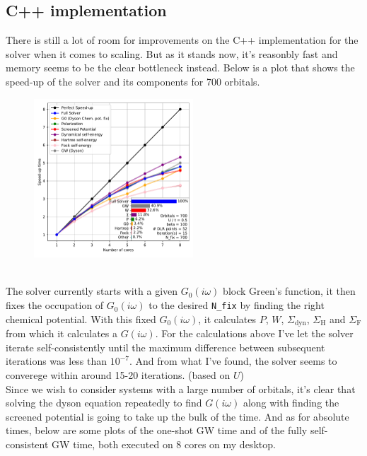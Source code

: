 \documentclass[12pt]{article}
\begin{document}
\noindent
\subsection*{C++ implementation}
There is still a lot of room for improvements on the C++ implementation for the solver when it comes to scaling. But as it stands now, it's reasonbly fast and memory seems to be the clear bottleneck instead. Below is a plot that shows the speed-up of the solver and its components for 700 orbitals.
\begin{figure}[h!]
  \centering

    \includegraphics[width=0.53\textwidth]{700.pdf}
\end{figure}\\
The solver currently starts with a given $G_0(i\omega)$ block Green's function, it then fixes the occupation of $G_0(i\omega)$ to the desired \texttt{N\_fix} by finding the right chemical potential. With this fixed $G_0(i\omega)$, it calculates $P$, $W$, $\Sigma_\text{dyn}$, $\Sigma_\text{H}$ and $\Sigma_\text{F}$ from which it calculates a $G(i\omega)$. For the calculations above I've let the solver iterate self-consistently until the maximum difference between subsequent iterations was less than $10^{-7}$. And from what I've found, the solver seems to converege within around 15-20 iterations. (based on $U$)\\
Since we wish to consider systems with a large number of orbitals, it's clear that solving the dyson equation repeatedly to find $G(i\omega)$ along with finding the screened potential is going to take up the bulk of the time. And as for absolute times, below are some plots of the one-shot GW time and of the fully self-consistent GW time, both executed on 8 cores on my desktop.
\end{document}
